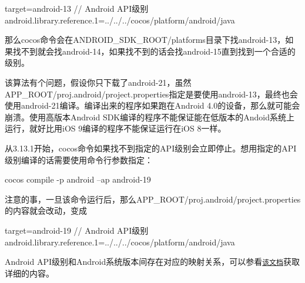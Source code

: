 \begin{DoxyCode}
target=android-13 // Android API级别
android.library.reference.1=../../../cocos/platform/android/java
\end{DoxyCode}
 那么cocos命令会在{\ttfamily A\+N\+D\+R\+O\+I\+D\+\_\+\+S\+D\+K\+\_\+\+R\+O\+O\+T/platforms}目录下找{\ttfamily android-\/13}，如果找不到就会找{\ttfamily android-\/14}，如果找不到的话会找{\ttfamily android-\/15}直到找到一个合适的级别。

该算法有个问题，假设你只下载了{\ttfamily android-\/21}，虽然{\ttfamily A\+P\+P\+\_\+\+R\+O\+O\+T/proj.\+android/project.properties}指定是要使用{\ttfamily android-\/13}，最终也会使用{\ttfamily android-\/21}编译。编译出来的程序如果跑在\+Android 4.\+0的设备，那么就可能会崩溃。使用高版本\+Android S\+D\+K编译的程序不能保证能在低版本的\+Andoid系统上运行，就好比用i\+OS 9编译的程序不能保证运行在i\+OS 8一样。

从3.13.\+1开始，cocos命令如果找不到指定的\+A\+P\+I级别会立即停止。想用指定的\+A\+P\+I级别编译的话需要使用命令行参数指定：


\begin{DoxyCode}
cocos compile -p android --ap android-19
\end{DoxyCode}
 注意的事，一旦该命令运行后，那么{\ttfamily A\+P\+P\+\_\+\+R\+O\+O\+T/proj.\+android/project.properties}的内容就会改动，变成


\begin{DoxyCode}
target=android-19 // Android API级别
android.library.reference.1=../../../cocos/platform/android/java
\end{DoxyCode}


Android A\+P\+I级别和\+Android系统版本间存在对应的映射关系，可以参看\href{https://developer.android.com/guide/topics/manifest/uses-sdk-element.html}{\tt 该文档}获取详细的内容。 